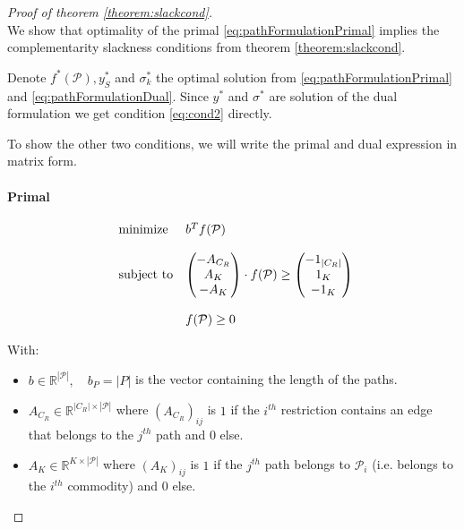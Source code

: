 \documentclass[14pt,a4paper]{article}
\theoremstyle{definition}
\numberwithin{equation}{subsection}
\begin{document}
\begin{proof}[Proof of theorem \ref{theorem:slackcond}]$ $\\
	 We show that optimality of the primal \eqref{eq:pathFormulationPrimal} implies the complementarity slackness conditions from theorem \ref{theorem:slackcond}. 
	 
	 Denote $f^*(\mathcal{P}),y^*_{S}$ and $\sigma^*_k$ the optimal solution from \eqref{eq:pathFormulationPrimal} and \eqref{eq:pathFormulationDual}. Since $y^*$ and $\sigma^*$ are solution of the dual formulation we get condition \eqref{eq:cond2} directly.
	 
	 To show the other two conditions, we will write the primal and dual expression in matrix form.
	 
	 \paragraph{Primal}
	 \begin{equation*}
	 	\begin{array}{ll@{}ll}
	 \text{minimize}  &b^T f(\mathcal{P})  \\
	 \\
	 \text{subject to} 
	 &\left( \begin{matrix} -A_{C_R}	\\ A_K \\ -A_K \\ \end{matrix} \right) \cdot f(\mathcal{P}) \geq  \left( \begin{matrix} -1_{|C_R|}	\\ 1_K \\ -1_K \\ \end{matrix} \right) \\
	 \\
	                                          &f(\mathcal{P}) \geq 0
	 \end{array}
	 \label{eq:matrixformprimal}
	 \end{equation*}
	 
	 With: 
	 \begin{itemize}
	 	\item $b \in \mathbb{R}^{|\mathcal{P}|}, \quad b_P = |P|$ is the vector containing the length of the paths.
	 	\item $A_{C_R} \in \mathbb{R}^{|C_R|\times |\mathcal{P}|}$ where $\left(A_{C_R}\right)_{ij}$ is $1$ if the $i^{th}$ restriction contains an edge that belongs to the $j^{th}$ path and $0$ else.
	 	\item $A_K \in \mathbb{R}^{K\times |\mathcal{P}|}$ where $\left(A_K\right)_{ij}$ is $1$ if the $j^{th}$ path belongs to $\mathcal{P}_i$ (i.e. belongs to the $i^{th}$ commodity) and $0$ else.
	 \end{itemize}
 

\end{proof}
\end{document}
